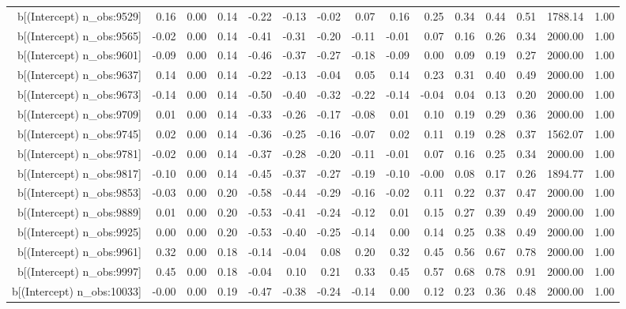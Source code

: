 \begin{table}[ht]
\begin{tabular}{rrrrrrrrrrrrrrr}
  b[(Intercept) n\_obs:9529] & 0.16 & 0.00 & 0.14 & -0.22 & -0.13 & -0.02 & 0.07 & 0.16 & 0.25 & 0.34 & 0.44 & 0.51 & 1788.14 & 1.00 \\ 
  b[(Intercept) n\_obs:9565] & -0.02 & 0.00 & 0.14 & -0.41 & -0.31 & -0.20 & -0.11 & -0.01 & 0.07 & 0.16 & 0.26 & 0.34 & 2000.00 & 1.00 \\ 
  b[(Intercept) n\_obs:9601] & -0.09 & 0.00 & 0.14 & -0.46 & -0.37 & -0.27 & -0.18 & -0.09 & 0.00 & 0.09 & 0.19 & 0.27 & 2000.00 & 1.00 \\ 
  b[(Intercept) n\_obs:9637] & 0.14 & 0.00 & 0.14 & -0.22 & -0.13 & -0.04 & 0.05 & 0.14 & 0.23 & 0.31 & 0.40 & 0.49 & 2000.00 & 1.00 \\ 
  b[(Intercept) n\_obs:9673] & -0.14 & 0.00 & 0.14 & -0.50 & -0.40 & -0.32 & -0.22 & -0.14 & -0.04 & 0.04 & 0.13 & 0.20 & 2000.00 & 1.00 \\ 
  b[(Intercept) n\_obs:9709] & 0.01 & 0.00 & 0.14 & -0.33 & -0.26 & -0.17 & -0.08 & 0.01 & 0.10 & 0.19 & 0.29 & 0.36 & 2000.00 & 1.00 \\ 
  b[(Intercept) n\_obs:9745] & 0.02 & 0.00 & 0.14 & -0.36 & -0.25 & -0.16 & -0.07 & 0.02 & 0.11 & 0.19 & 0.28 & 0.37 & 1562.07 & 1.00 \\ 
  b[(Intercept) n\_obs:9781] & -0.02 & 0.00 & 0.14 & -0.37 & -0.28 & -0.20 & -0.11 & -0.01 & 0.07 & 0.16 & 0.25 & 0.34 & 2000.00 & 1.00 \\ 
  b[(Intercept) n\_obs:9817] & -0.10 & 0.00 & 0.14 & -0.45 & -0.37 & -0.27 & -0.19 & -0.10 & -0.00 & 0.08 & 0.17 & 0.26 & 1894.77 & 1.00 \\ 
  b[(Intercept) n\_obs:9853] & -0.03 & 0.00 & 0.20 & -0.58 & -0.44 & -0.29 & -0.16 & -0.02 & 0.11 & 0.22 & 0.37 & 0.47 & 2000.00 & 1.00 \\ 
  b[(Intercept) n\_obs:9889] & 0.01 & 0.00 & 0.20 & -0.53 & -0.41 & -0.24 & -0.12 & 0.01 & 0.15 & 0.27 & 0.39 & 0.49 & 2000.00 & 1.00 \\ 
  b[(Intercept) n\_obs:9925] & 0.00 & 0.00 & 0.20 & -0.53 & -0.40 & -0.25 & -0.14 & 0.00 & 0.14 & 0.25 & 0.38 & 0.49 & 2000.00 & 1.00 \\ 
  b[(Intercept) n\_obs:9961] & 0.32 & 0.00 & 0.18 & -0.14 & -0.04 & 0.08 & 0.20 & 0.32 & 0.45 & 0.56 & 0.67 & 0.78 & 2000.00 & 1.00 \\ 
  b[(Intercept) n\_obs:9997] & 0.45 & 0.00 & 0.18 & -0.04 & 0.10 & 0.21 & 0.33 & 0.45 & 0.57 & 0.68 & 0.78 & 0.91 & 2000.00 & 1.00 \\ 
  b[(Intercept) n\_obs:10033] & -0.00 & 0.00 & 0.19 & -0.47 & -0.38 & -0.24 & -0.14 & 0.00 & 0.12 & 0.23 & 0.36 & 0.48 & 2000.00 & 1.00 \\ 

\end{tabular}
\end{table}
